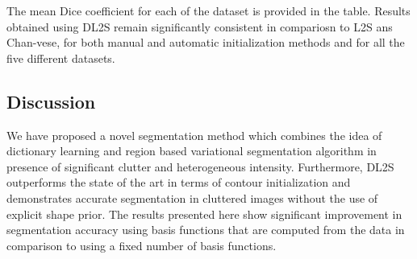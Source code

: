 The mean Dice coefficient for each of the dataset is provided in the table. Results obtained using DL2S remain significantly consistent in compariosn to L2S ans Chan-vese, for both manual and automatic initialization methods and for all the five different datasets.  

\subsection{Discussion}
We have proposed a novel segmentation method which combines the idea of dictionary learning and region based variational segmentation algorithm in presence of significant clutter and heterogeneous intensity. Furthermore, DL2S outperforms the state of the art in terms of contour initialization and demonstrates accurate segmentation in cluttered images without the use of explicit shape prior. The results presented here show significant improvement in segmentation accuracy using basis functions that are computed from the data in comparison to using a fixed number of basis functions.

